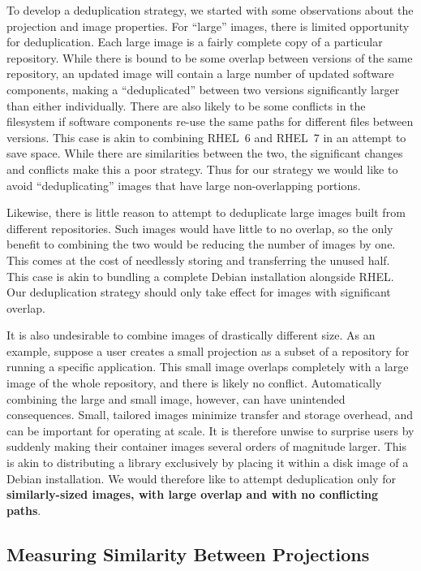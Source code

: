 \documentclass[sigconf]{acmart}
\begin{document}
To develop a deduplication strategy,
we started with some observations about the projection and image properties.
For ``large'' images,
there is limited opportunity for deduplication.
Each large image is a fairly complete copy of a particular repository.
While there is bound to be some overlap between versions of the same repository,
an updated image will contain a large number of updated software components,
making a ``deduplicated'' between two versions significantly larger than either individually.
There are also likely to be some conflicts in the filesystem if software components re-use the same paths for different files between versions.
This case is akin to combining RHEL~6 and RHEL~7 in an attempt to save space.
While there are similarities between the two,
the significant changes and conflicts make this a poor strategy.
Thus for our strategy we would like to avoid ``deduplicating'' images that have large non-overlapping portions.

Likewise, there is little reason to attempt to deduplicate large images built from different repositories.
Such images would have little to no overlap,
so the only benefit to combining the two would be reducing the number of images by one.
This comes at the cost of needlessly storing and transferring the unused half.
This case is akin to bundling a complete Debian installation alongside RHEL.
Our deduplication strategy should only take effect for images with significant overlap.

It is also undesirable to combine images of drastically different size.
As an example, suppose a user creates a small projection as a subset of a repository for running a specific application.
This small image overlaps completely with a large image of the whole repository,
and there is likely no conflict.
Automatically combining the large and small image, however,
can have unintended consequences.
Small, tailored images minimize transfer and storage overhead,
and can be important for operating at scale.
It is therefore unwise to surprise users by suddenly making their container images several orders of magnitude larger.
This is akin to distributing a library exclusively by placing it within a disk image of a Debian installation.
We would therefore like to attempt deduplication only for
{\bf similarly-sized images, with large overlap and with no conflicting paths}.


\subsection{Measuring Similarity Between Projections}
\end{document}
